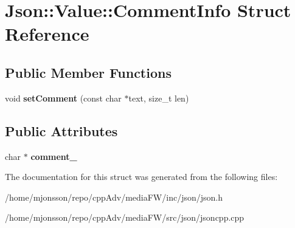 \hypertarget{structJson_1_1Value_1_1CommentInfo}{}\section{Json\+:\+:Value\+:\+:Comment\+Info Struct Reference}
\label{structJson_1_1Value_1_1CommentInfo}
\subsection*{Public Member Functions}
\begin{DoxyCompactItemize}
\item 
\mbox{\label{structJson_1_1Value_1_1CommentInfo_a4d01c2cd8c07995969c5d636dfd4fa8c}} 
void {\bfseries set\+Comment} (const char $\ast$text, size\+\_\+t len)
\end{DoxyCompactItemize}
\subsection*{Public Attributes}
\begin{DoxyCompactItemize}
\item 
\mbox{\label{structJson_1_1Value_1_1CommentInfo_a020f19c7098bab8ec8fec14cd1a5afb9}} 
char $\ast$ {\bfseries comment\+\_\+}
\end{DoxyCompactItemize}


The documentation for this struct was generated from the following files\+:\begin{DoxyCompactItemize}
\item 
/home/mjonsson/repo/cpp\+Adv/media\+F\+W/inc/json/json.\+h\item 
/home/mjonsson/repo/cpp\+Adv/media\+F\+W/src/json/jsoncpp.\+cpp\end{DoxyCompactItemize}
